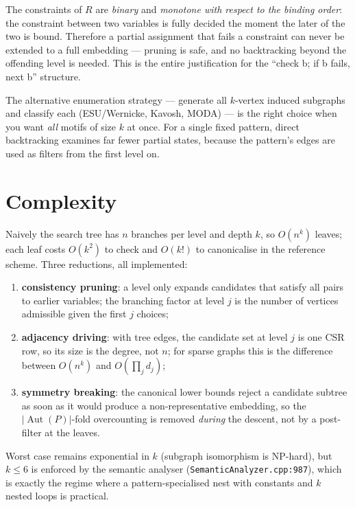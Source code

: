 \documentclass[11pt,a4paper]{article}
\newcommand{\file}[1]{\texttt{#1}}
\newcommand{\Aut}{\operatorname{Aut}}
\begin{document}
The constraints of $R$ are \emph{binary} and \emph{monotone with respect to the
binding order}: the constraint between two variables is fully decided the moment
the later of the two is bound. Therefore a partial assignment that fails a
constraint can never be extended to a full embedding --- pruning is safe, and no
backtracking beyond the offending level is needed. This is the entire
justification for the ``check b; if b fails, next b'' structure.

The alternative enumeration strategy --- generate all $k$-vertex induced
subgraphs and classify each (ESU/Wernicke, Kavosh, MODA) --- is the right choice
when you want \emph{all} motifs of size $k$ at once. For a single fixed pattern,
direct backtracking examines far fewer partial states, because the pattern's
edges are used as filters from the first level on.

\section{Complexity}

Naively the search tree has $n$ branches per level and depth $k$, so
$O(n^k)$ leaves; each leaf costs $O(k^2)$ to check and $O(k!)$ to canonicalise in
the reference scheme. Three reductions, all implemented:

\begin{enumerate}
  \item \textbf{consistency pruning}: a level only expands candidates that
        satisfy all pairs to earlier variables; the branching factor at level $j$
        is the number of vertices admissible given the first $j$ choices;
  \item \textbf{adjacency driving}: with tree edges, the candidate set at level
        $j$ is one CSR row, so its size is the degree, not $n$; for sparse graphs
        this is the difference between $O(n^k)$ and $O\!\left(\prod_j d_j\right)$;
  \item \textbf{symmetry breaking}: the canonical lower bounds reject a candidate
        subtree as soon as it would produce a non-representative embedding, so
        the $|\Aut(P)|$-fold overcounting is removed \emph{during} the descent,
        not by a post-filter at the leaves.
\end{enumerate}

Worst case remains exponential in $k$ (subgraph isomorphism is NP-hard), but
$k\le 6$ is enforced by the semantic analyser
(\file{SemanticAnalyzer.cpp:987}), which is exactly the regime where a
pattern-specialised nest with constants and $k$ nested loops is practical.
\end{document}

